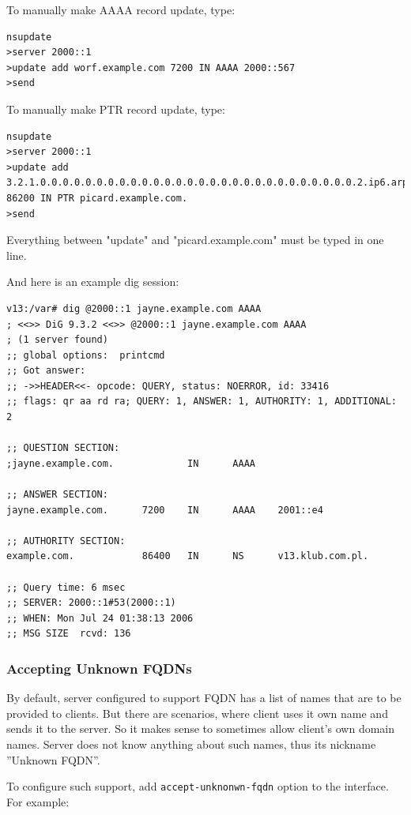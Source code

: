 
To manually make AAAA record update, type:
\begin{lstlisting}
nsupdate
>server 2000::1
>update add worf.example.com 7200 IN AAAA 2000::567
>send
\end{lstlisting}

To manually make PTR record update, type:
\begin{lstlisting}
nsupdate
>server 2000::1
>update add 
3.2.1.0.0.0.0.0.0.0.0.0.0.0.0.0.0.0.0.0.0.0.0.0.0.0.0.0.0.0.0.2.ip6.arpa.
86200 IN PTR picard.example.com. 
>send
\end{lstlisting}

\Note Everything between "update" and "picard.example.com" must be typed in one line.

And here is an example dig session:

\begin{lstlisting}
v13:/var# dig @2000::1 jayne.example.com AAAA
; <<>> DiG 9.3.2 <<>> @2000::1 jayne.example.com AAAA
; (1 server found)
;; global options:  printcmd
;; Got answer:
;; ->>HEADER<<- opcode: QUERY, status: NOERROR, id: 33416
;; flags: qr aa rd ra; QUERY: 1, ANSWER: 1, AUTHORITY: 1, ADDITIONAL: 2

;; QUESTION SECTION:
;jayne.example.com.             IN      AAAA

;; ANSWER SECTION:
jayne.example.com.      7200    IN      AAAA    2001::e4

;; AUTHORITY SECTION:
example.com.            86400   IN      NS      v13.klub.com.pl.

;; Query time: 6 msec
;; SERVER: 2000::1#53(2000::1)
;; WHEN: Mon Jul 24 01:38:13 2006
;; MSG SIZE  rcvd: 136
\end{lstlisting}

\subsubsection{Accepting Unknown FQDNs}
By default, server configured to support FQDN has a list of names that
are to be provided to clients. But there are scenarios, where client
uses it own name and sends it to the server. So it makes sense to
sometimes allow client's own domain names. Server does not know
anything about such names, thus its nickname ''Unknown FQDN''.

To configure such support, add \verb+accept-unknonwn-fqdn+ option to
the interface. For example:

